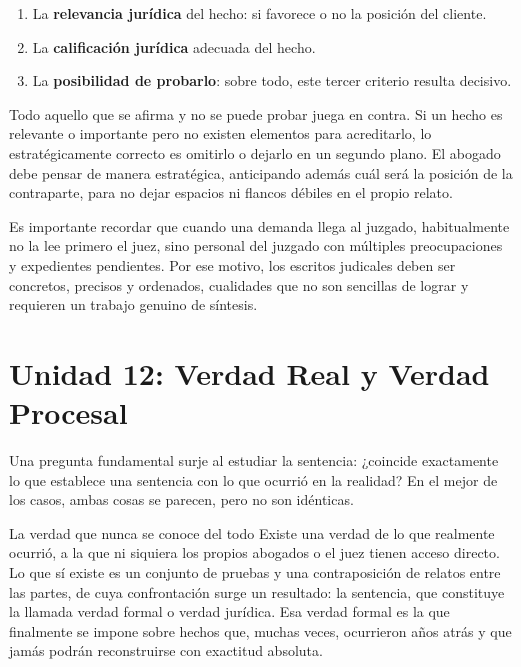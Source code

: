 \documentclass[12pt,oneside]{book}
\begin{document}
\begin{enumerate}
    \item La \textbf{relevancia jurídica} del hecho: si favorece o no la posición del cliente.
    \item La \textbf{calificación jurídica} adecuada del hecho.
    \item La \textbf{posibilidad de probarlo}: sobre todo, este tercer criterio resulta decisivo.
\end{enumerate}

\begin{important}
Todo aquello que se afirma y no se puede probar juega en contra. Si un hecho es relevante o importante pero no existen elementos para acreditarlo, lo estratégicamente correcto es omitirlo o dejarlo en un segundo plano. El abogado debe pensar de manera estratégica, anticipando además cuál será la posición de la contraparte, para no dejar espacios ni flancos débiles en el propio relato.
\end{important}

Es importante recordar que cuando una demanda llega al juzgado, habitualmente no la lee primero el juez, sino personal del juzgado con múltiples preocupaciones y expedientes pendientes. Por ese motivo, los escritos judicales deben ser concretos, precisos y ordenados, cualidades que no son sencillas de lograr y requieren un trabajo genuino de síntesis.

\section{Unidad 12: Verdad Real y Verdad Procesal}

Una pregunta fundamental surje al estudiar la sentencia: ¿coincide exactamente lo que establece una sentencia con lo que ocurrió en la realidad? En el mejor de los casos, ambas cosas se parecen, pero no son idénticas.

\begin{example}{La verdad que nunca se conoce del todo}
Existe una verdad de lo que realmente ocurrió, a la que ni siquiera los propios abogados o el juez tienen acceso directo. Lo que sí existe es un conjunto de pruebas y una contraposición de relatos entre las partes, de cuya confrontación surge un resultado: la sentencia, que constituye la llamada verdad formal o verdad jurídica. Esa verdad formal es la que finalmente se impone sobre hechos que, muchas veces, ocurrieron años atrás y que jamás podrán reconstruirse con exactitud absoluta.
\end{example}
\end{document}
